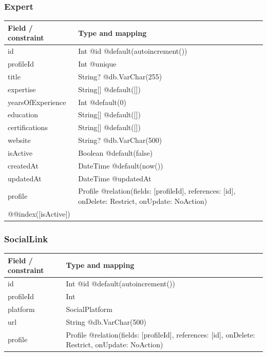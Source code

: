 \subsubsection{Expert}
\begin{longtable}{|L{3.3cm}|L{10.8cm}|}\hline
Field / constraint & Type and mapping \\ \hline
id & Int @id @default(autoincrement()) \\ \hline
profileId & Int @unique \\ \hline
title & String? @db.VarChar(255) \\ \hline
expertise & String[] @default([]) \\ \hline
yearsOfExperience & Int @default(0) \\ \hline
education & String[] @default([]) \\ \hline
certifications & String[] @default([]) \\ \hline
website & String? @db.VarChar(500) \\ \hline
isActive & Boolean @default(false) \\ \hline
createdAt & DateTime @default(now()) \\ \hline
updatedAt & DateTime @updatedAt \\ \hline
profile & Profile @relation(fields: [profileId], references: [id], onDelete: Restrict, onUpdate: NoAction) \\ \hline
@@index([isActive]) &  \\ \hline
\end{longtable}
\subsubsection{SocialLink}
\begin{longtable}{|L{3.3cm}|L{10.8cm}|}\hline
Field / constraint & Type and mapping \\ \hline
id & Int @id @default(autoincrement()) \\ \hline
profileId & Int \\ \hline
platform & SocialPlatform \\ \hline
url & String @db.VarChar(500) \\ \hline
profile & Profile @relation(fields: [profileId], references: [id], onDelete: Restrict, onUpdate: NoAction) \\ \hline
\end{longtable}
